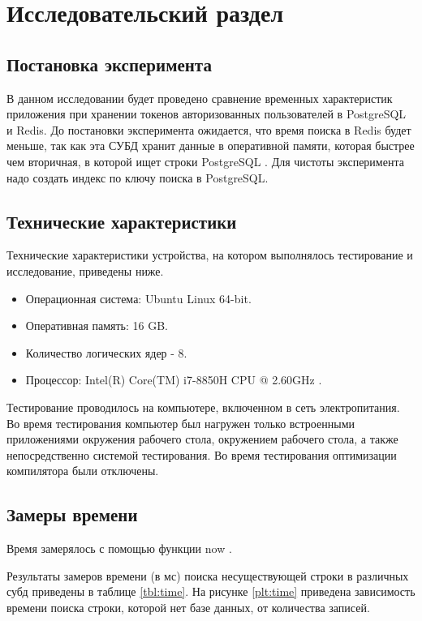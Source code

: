 \chapter{Исследовательский раздел}

\section{Постановка эксперимента}
В данном исследовании будет проведено сравнение временных характеристик приложения при хранении токенов авторизованных пользователей в PostgreSQL и Redis. До постановки эксперимента ожидается, что время поиска в Redis будет меньше, так как эта СУБД хранит данные в оперативной памяти, которая быстрее чем вторичная, в которой ищет строки PostgreSQL \cite{redis}. Для чистоты эксперимента надо создать индекс по ключу поиска в PostgreSQL.

\section{Технические характеристики}

Технические характеристики устройства, на котором выполнялось тестирование и исследование, приведены ниже.

\begin{itemize}
	\item Операционная система: Ubuntu Linux 64-bit.
	\item Оперативная память: 16 GB.
	\item Количество логических ядер - 8.
	\item Процессор: Intel(R) Core(TM) i7-8850H CPU @ 2.60GHz \cite{intel}.
\end{itemize}

Тестирование проводилось на компьютере, включенном в сеть электропитания. Во время тестирования компьютер был нагружен только встроенными приложениями окружения рабочего стола, окружением рабочего стола, а также непосредственно системой тестирования. Во время тестирования оптимизации компилятора были отключены.


\section{Замеры времени}

Время замерялось с помощью функции now \cite{clock}.

Результаты замеров времени (в мс) поиска несуществующей строки в различных субд приведены в таблице \ref{tbl:time}. На рисунке \ref{plt:time} приведена зависимость времени поиска строки, которой нет базе данных, от количества записей.

